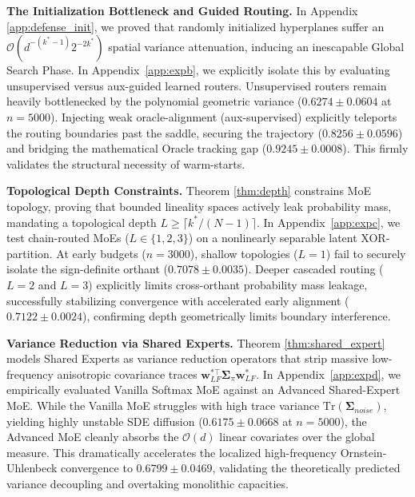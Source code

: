 \documentclass{article}
\newcommand{\1}{\mathbb{I}}
\newcommand{\calO}{\mathcal{O}}
\newcommand{\bw}{\mathbf{w}}
\newcommand{\bSigma}{\boldsymbol{\Sigma}}
\newcommand{\Tr}{\mathrm{Tr}}
\begin{document}
\textbf{The Initialization Bottleneck and Guided Routing.} In Appendix \ref{app:defense_init}, we proved that randomly initialized hyperplanes suffer an $\calO(d^{-(k^*-1)} 2^{-2k^*})$ spatial variance attenuation, inducing an inescapable Global Search Phase. In Appendix~\ref{app:expb}, we explicitly isolate this by evaluating unsupervised versus aux-guided learned routers. Unsupervised routers remain heavily bottlenecked by the polynomial geometric variance ($0.6274 \pm 0.0604$ at $n=5000$). Injecting weak oracle-alignment (aux-supervised) explicitly teleports the routing boundaries past the saddle, securing the trajectory ($0.8256 \pm 0.0596$) and bridging the mathematical Oracle tracking gap ($0.9245 \pm 0.0008$). This firmly validates the structural necessity of warm-starts.

\textbf{Topological Depth Constraints.} Theorem \ref{thm:depth} constrains MoE topology, proving that bounded lineality spaces actively leak probability mass, mandating a topological depth $L \ge \lceil k^*/(N-1) \rceil$. In Appendix~\ref{app:expc}, we test chain-routed MoEs ($L \in \{1, 2, 3\}$) on a nonlinearly separable latent XOR-partition. At early budgets ($n=3000$), shallow topologies ($L=1$) fail to securely isolate the sign-definite orthant ($0.7078 \pm 0.0035$). Deeper cascaded routing ($L=2$ and $L=3$) explicitly limits cross-orthant probability mass leakage, successfully stabilizing convergence with accelerated early alignment ($0.7122 \pm 0.0024$), confirming depth geometrically limits boundary interference.

\textbf{Variance Reduction via Shared Experts.} Theorem \ref{thm:shared_expert} models Shared Experts as variance reduction operators that strip massive low-frequency anisotropic covariance traces $\bw_{LF}^{*\top} \bSigma_\pi \bw_{LF}^*$. In Appendix~\ref{app:expd}, we empirically evaluated Vanilla Softmax MoE against an Advanced Shared-Expert MoE. While the Vanilla MoE struggles with high trace variance $\Tr(\bSigma_{noise})$, yielding highly unstable SDE diffusion ($0.6175 \pm 0.0668$ at $n=5000$), the Advanced MoE cleanly absorbs the $\calO(d)$ linear covariates over the global measure. This dramatically accelerates the localized high-frequency Ornstein-Uhlenbeck convergence to $0.6799 \pm 0.0469$, validating the theoretically predicted variance decoupling and overtaking monolithic capacities.
\end{document}
